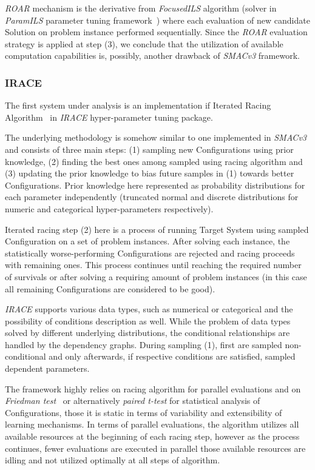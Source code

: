 \textit{ROAR} mechanism is the derivative from \textit{FocusedILS} algorithm (solver in \textit{ParamILS} parameter tuning framework~\cite{hutter2009paramils}) where each evaluation of new candidate Solution on problem instance performed sequentially. Since the \textit{ROAR} evaluation strategy is applied at step (3), we conclude that the utilization of available computation capabilities is, possibly, another drawback of \textit{SMACv3} framework.


\subsubsection{IRACE~\cite{lopez2016irace}}\label{bg: irace}
The first system under analysis is an implementation if Iterated Racing Algorithm~\cite{birattari2010f} in \textit{IRACE} hyper-parameter tuning package.

The underlying methodology is somehow similar to one implemented in \textit{SMACv3} and consists of three main steps: (1) sampling new Configurations using prior knowledge, (2) finding the best ones among sampled using racing algorithm and (3) updating the prior knowledge to bias future samples in (1) towards better Configurations. 
Prior knowledge here represented as probability distributions for each parameter independently (truncated normal and discrete distributions for numeric and categorical hyper-parameters respectively).%

Iterated racing step (2) here is a process of running Target System using sampled Configuration on a set of problem instances. After solving each instance, the statistically worse-performing Configurations are rejected and racing proceeds with remaining ones. This process continues until reaching the required number of survivals or after solving a requiring amount of problem instances (in this case all remaining Configurations are considered to be good). 

\textit{IRACE} supports various data types, such as numerical or categorical and the possibility of conditions description as well. While the problem of data types solved by different underlying distributions, the conditional relationships are handled by the dependency graphs. During sampling (1), first are sampled non-conditional and only afterwards, if respective conditions are satisfied, sampled dependent parameters. 

The framework highly relies on racing algorithm for parallel evaluations and on \textit{Friedman test}~\cite{conover1980practical} or alternatively \textit{paired t-test} for statistical analysis of Configurations, those it is static in terms of variability and extensibility of learning mechanisms. 
In terms of parallel evaluations, the algorithm utilizes all available resources at the beginning of each racing step, however as the process continues, fewer evaluations are executed in parallel those available resources are idling and not utilized optimally at all steps of algorithm.


